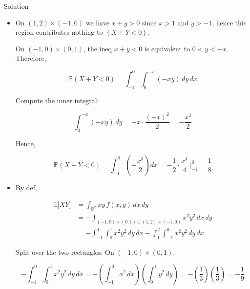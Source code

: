 \begin{qlsolution}{Solution}

\begin{itemize}
\item
  On \((1,2) \times ( - 1,0)\) we have \(\mathit{x} + \mathit{y} > 0\) since \(\mathit{x} > 1\) and \(\mathit{y} > - 1\), hence this region contributes nothing to \(\left\{ {\mathit{X} + \mathit{Y} < 0} \right\}\).

  On \(( - 1,0) \times (0,1)\), the ineq \(\mathit{x} + \mathit{y} < 0\) is equivalent to \(0 < \mathit{y} < - \mathit{x}\). Therefore,

  \[\mathbb{P}(\mathit{X} + \mathit{Y} < 0) = \int_{- 1}^{0}\int_{0}^{- \mathit{x}}( - \mathit{x}\mathit{y})\,\mathit{d}\mathit{y}\,\mathit{d}\mathit{x}\]

  Compute the inner integral:

  \[\int_{0}^{- \mathit{x}}( - \mathit{x}\mathit{y})\,\mathit{d}\mathit{y} = - \mathit{x} \cdot \frac{( - \mathit{x})^{2}}{2} = - \frac{\mathit{x}^{3}}{2}\]

  Hence,

  \[\mathbb{P}(\mathit{X} + \mathit{Y} < 0) = \int_{- 1}^{0}\left( {- \frac{\mathit{x}^{3}}{2}} \right)\mathit{d}\mathit{x} = - \frac{1}{2} \cdot \frac{\mathit{x}^{4}}{4}\ |_{- 1}^{0} = \frac{1}{8}\]
\item
  By def,

  \[\begin{matrix}
  {\mathbb{E}\lbrack\mathit{X}\mathit{Y}\rbrack} & {= \int_{\mathbb{R}^{2}}\mathit{x}\mathit{y}\,\mathit{f}(\mathit{x},\mathit{y})\,\mathit{d}\mathit{x}\,\mathit{d}\mathit{y}} \\
   & {= - \int_{( - 1,0) \times (0,1) \cup (1,2) \times ( - 1,0)}\mathit{x}^{2}\mathit{y}^{2}\,\mathit{d}\mathit{x}\,\mathit{d}\mathit{y}} \\
   & {= - \int_{- 1}^{0}\int_{0}^{1}\mathit{x}^{2}\mathit{y}^{2}\,\mathit{d}\mathit{y}\,\mathit{d}\mathit{x} - \int_{1}^{2}\int_{- 1}^{0}\mathit{x}^{2}\mathit{y}^{2}\,\mathit{d}\mathit{y}\,\mathit{d}\mathit{x}}
  \end{matrix}\]

  Split over the two rectangles. On \(( - 1,0) \times (0,1)\),

  \[- \int_{- 1}^{0}\int_{0}^{1}\mathit{x}^{2}\mathit{y}^{2}\,\mathit{d}\mathit{y}\,\mathit{d}\mathit{x} = - \left( {\int_{- 1}^{0}\mathit{x}^{2}\,\mathit{d}\mathit{x}} \right)\left( {\int_{0}^{1}\mathit{y}^{2}\,\mathit{d}\mathit{y}} \right) = - \left( \frac{1}{3} \right)\left( \frac{1}{3} \right) = - \frac{1}{9}\]


\end{itemize}
\end{qlsolution}
